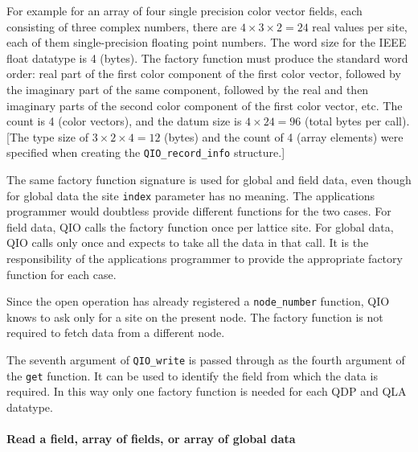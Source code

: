 \documentclass{article}
\begin{document}
For example for an array of four single precision color vector fields,
each consisting of three complex numbers, there are $4 \times 3 \times
2 = 24$ real values per site, each of them single-precision floating
point numbers.  The word size for the IEEE float datatype is 4
(bytes).  The factory function must produce the standard word order:
real part of the first color component of the first color vector,
followed by the imaginary part of the same component, followed by the
real and then imaginary parts of the second color component of the
first color vector, etc. The count is 4 (color vectors), and the datum
size is $4 \times 24 = 96$ (total bytes per call).  [The type size of
$3 \times 2 \times 4 = 12$ (bytes) and the count of 4 (array elements)
were specified when creating the \verb|QIO_record_info| structure.]

The same factory function signature is used for global and field data,
even though for global data the site \verb|index| parameter has no
meaning.  The applications programmer would doubtless provide
different functions for the two cases.  For field data, QIO calls the
factory function once per lattice site.  For global data, QIO calls
only once and expects to take all the data in that call.  It is the
responsibility of the applications programmer to provide the
appropriate factory function for each case.

Since the open operation has already registered a \verb|node_number|
function, QIO knows to ask only for a site on the present node.  The
factory function is not required to fetch data from a different node.

The seventh argument of \verb|QIO_write| is passed through as the fourth
argument of the \verb|get| function.  It can be used to identify the
field from which the data is required.  In this way only one factory
function is needed for each QDP and QLA datatype.

\paragraph{Read a field, array of fields, or array of global data}
\end{document}
